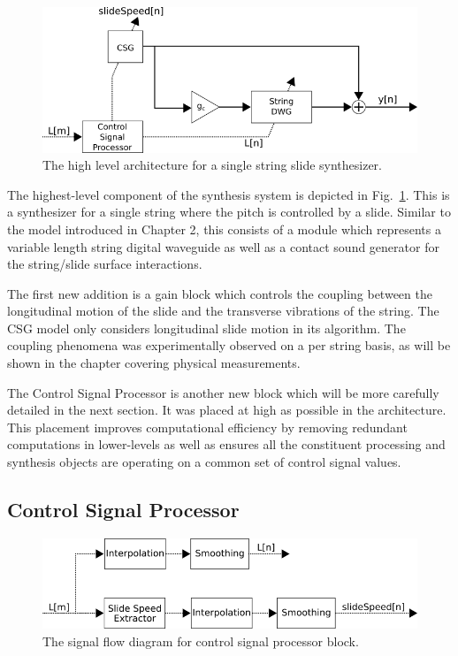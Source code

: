 \documentclass[../main.tex]{subfiles}
\begin{document}
\begin{figure}[h]
    \centering
    \includegraphics[scale=.65]{./images/diagrams/slideSynth.png}
    \caption{The high level architecture for a single string slide synthesizer.}
    \label{fig:slide_synth}
\end{figure}

The highest-level component of the synthesis system is depicted in Fig.~\ref{fig:slide_synth}. This is a synthesizer for a single string where the pitch is controlled by a slide. Similar to the model introduced in Chapter 2, this consists of a module which represents a variable length string digital waveguide as well as a contact sound generator for the string/slide surface interactions. 

The first new addition is a gain block which controls the coupling between the longitudinal motion of the slide and the transverse vibrations of the string. The CSG model only considers longitudinal slide motion in its algorithm. The coupling phenomena was experimentally observed on a per string basis, as will be shown in the chapter covering physical measurements.

The Control Signal Processor is another new block which will be more carefully detailed in the next section. It was placed at high as possible in the architecture. This placement improves computational efficiency by removing redundant computations in lower-levels as well as ensures all the constituent processing and synthesis objects are operating on a common set of control signal values.

\subsection{Control Signal Processor}

\begin{figure}[h]
    \centering
    \includegraphics[scale=.65]{./images/diagrams/controlSignalProcessor.png}
    \caption{The signal flow diagram for control signal processor block.}
    \label{fig:CSP}
\end{figure}
\end{document}
